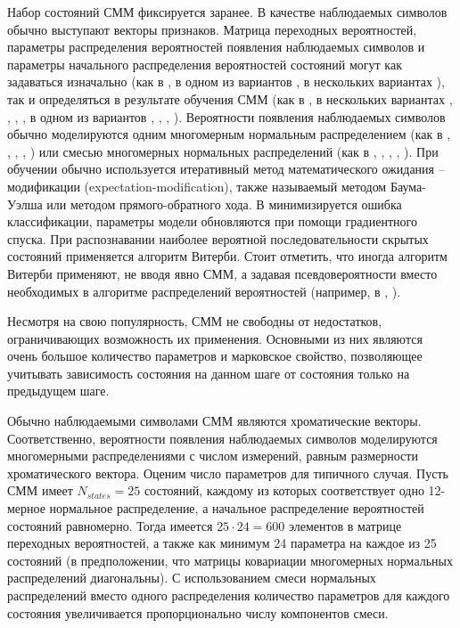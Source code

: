 Набор состояний СММ фиксируется заранее. В качестве наблюдаемых символов обычно
выступают векторы признаков. Матрица переходных вероятностей, параметры
распределения вероятностей появления наблюдаемых символов и параметры начального
распределения вероятностей состояний могут как задаваться изначально (как в
\cite{Bello2005}, в одном из вариантов \cite{Papadopoulos2007}, в нескольких
вариантах \cite{Cho2010}), так и определяться в результате обучения СММ (как в
\cite{Burgoyne2007}, в нескольких вариантах \cite{Papadopoulos2007},
 \cite{Mauch2008}, \cite{Khadkevich2009}, \cite{Reed2009}, в одном из вариантов
\cite{Cho2010}, \cite{Jiang2011}, \cite{Khadkevich2011}, \cite{Ni2011}).
Вероятности появления наблюдаемых символов обычно моделируются одним многомерным
нормальным распределением (как в \cite{Sheh2003}, \cite{Bello2005},
\cite{Papadopoulos2007}, \cite{Ni2011}, \cite{Chen2012}) или смесью многомерных
нормальных распределений (как в \cite{Burgoyne2007}, \cite{Khadkevich2009},
\cite{Reed2009}, \cite{Cho2010}, \cite{Khadkevich2011}). При обучении обычно
используется итеративный метод математического ожидания -- модификации
(expectation-modification), также называемый методом Баума-Уэлша или методом
прямого-обратного хода. В \cite{Reed2009} минимизируется ошибка классификации,
параметры модели обновляются при помощи градиентного спуска. При распознавании
наиболее вероятной последовательности скрытых состояний применяется алгоритм
Витерби. Стоит отметить, что иногда алгоритм Витерби применяют, не вводя явно
СММ, а задавая псевдовероятности вместо необходимых в алгоритме распределений
вероятностей (например, в \cite{Cho2011}, \cite{Humphrey2012}).

Несмотря на свою популярность, СММ не свободны от недостатков, ограничивающих
возможность их применения. Основными из них являются очень большое количество
параметров и марковское свойство, позволяющее учитывать зависимость состояния на
данном шаге от состояния только на предыдущем шаге.

Обычно наблюдаемыми символами СММ являются хроматические векторы.
Соответственно, вероятности появления наблюдаемых символов моделируются
многомерными распределениями с числом измерений, равным размерности
хроматического вектора. Оценим число параметров для типичного случая. Пусть СММ
имеет $N_{states} = 25$ состояний, каждому из которых соответствует одно
12-мерное нормальное распределение, а начальное распределение вероятностей
состояний равномерно. Тогда имеется $25 \cdot 24 = 600$ элементов в матрице
переходных вероятностей, а также как минимум 24 параметра на каждое из 25
состояний (в предположении, что матрицы ковариации многомерных нормальных
распределений диагональны). С использованием смеси нормальных распределений
вместо одного распределения количество параметров для каждого состояния
увеличивается пропорционально числу компонентов смеси.

